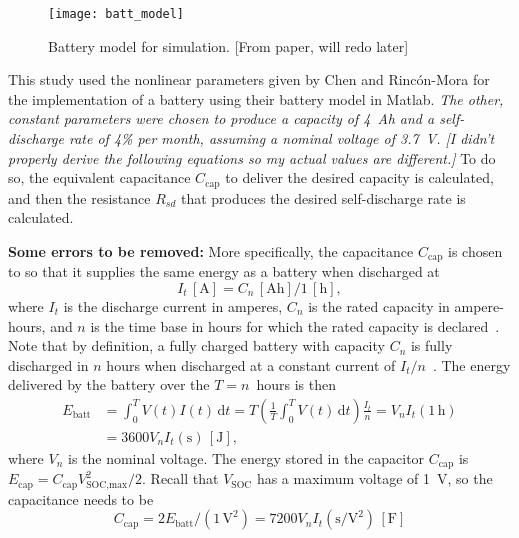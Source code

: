 \documentclass[../zhang_thesis.tex]{subfiles}
\begin{document}
\begin{figure}[ht]
\centering
\texttt{[image: batt\_model]}
\caption{Battery model for simulation. [From paper, will redo later]}
\label{fig:batt_model}
\end{figure}

This study used the nonlinear parameters given by Chen and Rinc\'on-Mora for the implementation of a battery using their battery model in Matlab. \emph{The other, constant parameters were chosen to produce a capacity of 4~Ah and a self-discharge rate of 4\% per month, assuming a nominal voltage of 3.7~V. [I didn't properly derive the following equations so my actual values are different.]} To do so, the equivalent capacitance $C_\text{cap}$ to deliver the desired capacity is calculated, and then the resistance $R_{sd}$
that produces the desired self-discharge rate is calculated. 

\textbf{Some errors to be removed:}
{\color{red}
More specifically, the capacitance $C_\text{cap}$ is chosen to so that it supplies the same energy as a battery when discharged at
\begin{equation}
    I_t\,[\text{A}] = C_n\,[\text{Ah}] / 1\,[\text{h}],
\end{equation}
where $I_t$ is the discharge current in amperes, $C_n$ is the rated capacity in ampere-hours, and $n$ is the time base in hours for which the rated capacity is declared~\cite{iec61434,linden01_ch3}. Note that by definition, a fully charged battery with capacity $C_n$ is fully discharged in $n$ hours when discharged at a constant current of $I_t/n$~\cite{linden01_ch3}. The energy delivered by the battery over the $T=n$~hours is then
\begin{align}
    E_\text{batt} &= \int_0^T V(t) I(t) \,\mathrm{d}t = T \left( \frac{1}{T} \int_0^T V(t)\,\mathrm{d}t \right) \frac{I_t}{n} = V_n I_t (1\,\text{h}) \\
    &= 3600 V_n I_t (\text{s}) \,[\text{J}],
\end{align}
where $V_n$ is the nominal voltage. The energy stored in the capacitor $C_\text{cap}$ is $E_\text{cap} = C_\text{cap} V_\text{SOC,max}^2 / 2$. Recall that $V_\text{SOC}$ has a maximum voltage of 1~V, so the capacitance needs to be
\begin{equation}
    C_\text{cap} = 2E_\text{batt}/(1\,\text{V}^2) = 7200 V_n I_t (\text{s}/\text{V}^2) \,[\text{F}]
\end{equation}
}
\end{document}
